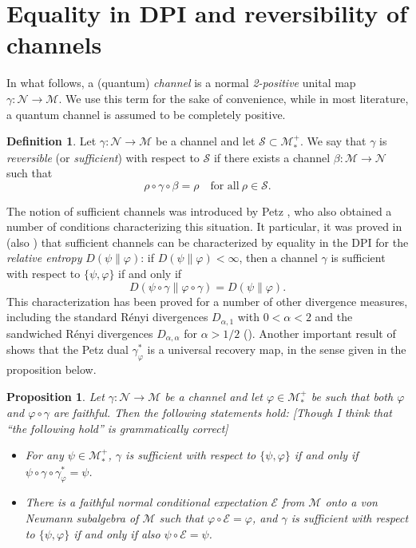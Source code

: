 \documentclass[12pt]{article}
\newtheorem{prop}[theorem]{Proposition}
\theoremstyle{definition}
\newtheorem{defi}[theorem]{Definition}
\theoremstyle{remark}
\numberwithin{equation}{section}
\def\Me{\mathcal M}
\def\Ne{\mathcal N}
\def\ffi{\varphi}
\begin{document}
\section{Equality in DPI and reversibility of channels}

In what follows, a (quantum) \emph{channel} is a normal \emph{2-positive} unital
map $\gamma: \Ne\to \Me$. We use this term for the sake of convenience, while in most literature,
a quantum channel is assumed to be completely positive.

\begin{defi}\label{defi:reversible}
Let $\gamma:\Ne\to \Me$ be a channel and let $\mathcal S \subset
\Me_*^+$. We say that $\gamma$ is \emph{reversible} (or \emph{sufficient}) with respect to
$\mathcal S$ if there exists a channel $\beta:\Me\to \Ne$ such that
\[
\rho\circ\gamma\circ\beta=\rho\quad\mbox{for all}\ \rho\in \mathcal S.
\]
\end{defi}

The notion of sufficient channels was introduced by Petz
\cite{petz1986sufficient,petz1988sufficiency}, who also obtained a number of conditions
characterizing this situation. It particular, it was proved in \cite{petz1988sufficiency}
(also \cite{jencova2006sufficiency}) that sufficient channels can be characterized by
equality in the DPI for the \emph{relative entropy} $D(\psi\|\varphi)$: if $D(\psi\|\varphi)<\infty$,
then a channel $\gamma$ is sufficient with respect to $\{\psi,\varphi\}$ if and only if 
\[
D(\psi\circ\gamma\|\varphi\circ\gamma)=D(\psi\|\varphi). 
\]
This characterization has been proved for a number of other divergence measures, including the
standard R\'enyi divergences $D_{\alpha,1}$ with $0<\alpha<2$  and the sandwiched
R\'enyi divergences $D_{\alpha,\alpha}$ for $\alpha>1/2$
(\cite{hiai2021quantum,jencova2018renyi,jencova2021renyi}).
Another important result of \cite{petz1988sufficiency} shows that the Petz dual $\gamma_\varphi^*$
is a universal recovery map, in the sense given in the proposition below. 

\begin{prop}\label{prop:universal}
Let $\gamma:\Ne\to \Me$ be a channel and let $\varphi\in \Me_*^+$ be such that both $\ffi$ and
$\ffi\circ\gamma$ are faithful. Then the following {\color{red}statements} hold:
{\color{blue}[Though I think that ``the following hold'' is grammatically correct]}
\begin{itemize}
\item[(i)] For any $\psi\in \Me_*^+$, $\gamma$ is sufficient with respect to $\{\psi,\varphi\}$ if and only
if $\psi\circ\gamma\circ\gamma_\varphi^*=\psi$.

\item[(ii)]
There is a faithful normal conditional expectation $\mathcal E$ from $\Me$ onto a von Neumann
subalgebra of $\Me$ such that $\varphi\circ \mathcal E=\varphi$, and $\gamma$ is sufficient with
respect to $\{\psi,\varphi\}$ if and only if also $\psi\circ\mathcal E=\psi$.
\end{itemize}
\end{prop}
\end{document}

